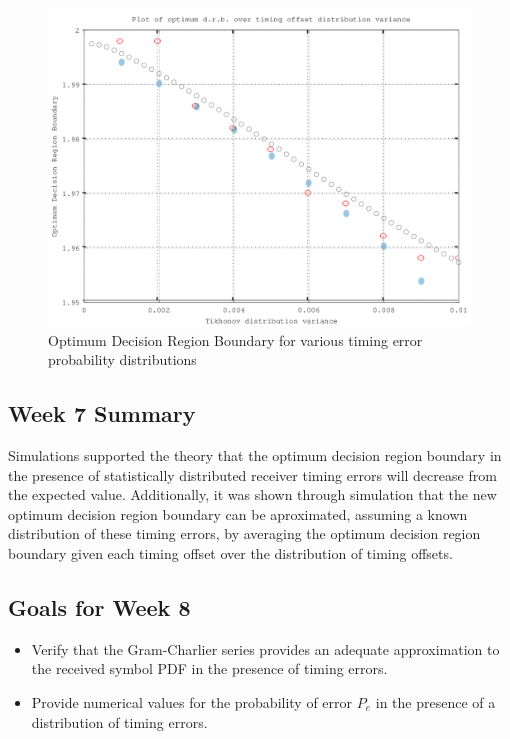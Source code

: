 \begin{figure}[htbp]
\centering
\includegraphics{../plots/opt_dec_reg.png}
\caption{Optimum Decision Region Boundary for various timing error
probability distributions}
\end{figure}

\subsection{Week 7 Summary}

Simulations supported the theory that the optimum decision region
boundary in the presence of statistically distributed receiver timing
errors will decrease from the expected value. Additionally, it was shown
through simulation that the new optimum decision region boundary can be
aproximated, assuming a known distribution of these timing errors, by
averaging the optimum decision region boundary given each timing offset
over the distribution of timing offsets.

\subsection{Goals for Week 8}

\begin{itemize}
\itemsep1pt\parskip0pt
\item
  Verify that the Gram-Charlier series provides an adequate
  approximation to the received symbol PDF in the presence of timing
  errors.
\item
  Provide numerical values for the probability of error $P_e$ in the
  presence of a distribution of timing errors.
\end{itemize}

